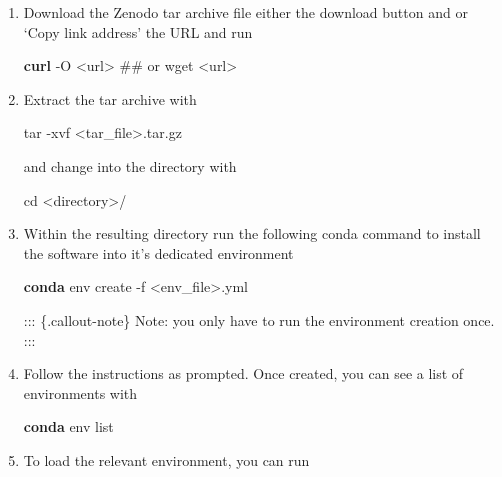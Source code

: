 \documentclass[
  letterpaper,
]{book}
\newenvironment{Shaded}{}{}
\newcommand{\AttributeTok}[1]{\textcolor[rgb]{0.84,0.23,0.29}{#1}}
\newcommand{\BuiltInTok}[1]{\textcolor[rgb]{0.84,0.23,0.29}{#1}}
\newcommand{\CommentTok}[1]{\textcolor[rgb]{0.42,0.45,0.49}{#1}}
\newcommand{\ExtensionTok}[1]{\textcolor[rgb]{0.84,0.23,0.29}{\textbf{#1}}}
\newcommand{\FunctionTok}[1]{\textcolor[rgb]{0.44,0.26,0.76}{#1}}
\newcommand{\NormalTok}[1]{\textcolor[rgb]{0.14,0.16,0.18}{#1}}
\newcommand{\OperatorTok}[1]{\textcolor[rgb]{0.14,0.16,0.18}{#1}}
\begin{document}
\begin{enumerate}
\def\labelenumi{\arabic{enumi}.}
\item
  Download the Zenodo tar archive file either the download button and or
  `Copy link address' the URL and run

\begin{Shaded}
\begin{Highlighting}[]
\ExtensionTok{curl} \AttributeTok{{-}O} \OperatorTok{\textless{}}\NormalTok{url}\OperatorTok{\textgreater{}}
\CommentTok{\#\# or}
\FunctionTok{wget} \OperatorTok{\textless{}}\NormalTok{url}\OperatorTok{\textgreater{}}
\end{Highlighting}
\end{Shaded}
\item
  Extract the tar archive with

\begin{Shaded}
\begin{Highlighting}[]
\FunctionTok{tar} \AttributeTok{{-}xvf} \OperatorTok{\textless{}}\NormalTok{tar\_file}\OperatorTok{\textgreater{}}\NormalTok{.tar.gz}
\end{Highlighting}
\end{Shaded}

  and change into the directory with

\begin{Shaded}
\begin{Highlighting}[]
\BuiltInTok{cd} \OperatorTok{\textless{}}\NormalTok{directory}\OperatorTok{\textgreater{}}\NormalTok{/}
\end{Highlighting}
\end{Shaded}
\item
  Within the resulting directory run the following conda command to
  install the software into it's dedicated environment

\begin{Shaded}
\begin{Highlighting}[]
\ExtensionTok{conda}\NormalTok{ env create }\AttributeTok{{-}f} \OperatorTok{\textless{}}\NormalTok{env\_file}\OperatorTok{\textgreater{}}\NormalTok{.yml}
\end{Highlighting}
\end{Shaded}

  ::: \{.callout-note\} Note: you only have to run the environment
  creation once. :::
\item
  Follow the instructions as prompted. Once created, you can see a list
  of environments with

\begin{Shaded}
\begin{Highlighting}[]
\ExtensionTok{conda}\NormalTok{ env list}
\end{Highlighting}
\end{Shaded}
\item
  To load the relevant environment, you can run


\end{enumerate}
\end{document}
